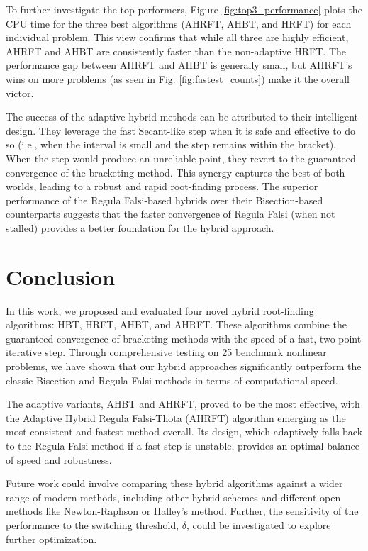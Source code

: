 \documentclass[reprint, amsmath, amssymb, aps, prl]{revtex4-2}
\begin{document}
\begin{table}[h!]
\begin{ruledtabular}
To further investigate the top performers, Figure \ref{fig:top3_performance} plots the CPU time for the three best algorithms (AHRFT, AHBT, and HRFT) for each individual problem. This view confirms that while all three are highly efficient, AHRFT and AHBT are consistently faster than the non-adaptive HRFT. The performance gap between AHRFT and AHBT is generally small, but AHRFT's wins on more problems (as seen in Fig. \ref{fig:fastest_counts}) make it the overall victor.

The success of the adaptive hybrid methods can be attributed to their intelligent design. They leverage the fast Secant-like step when it is safe and effective to do so (i.e., when the interval is small and the step remains within the bracket). When the step would produce an unreliable point, they revert to the guaranteed convergence of the bracketing method. This synergy captures the best of both worlds, leading to a robust and rapid root-finding process. The superior performance of the Regula Falsi-based hybrids over their Bisection-based counterparts suggests that the faster convergence of Regula Falsi (when not stalled) provides a better foundation for the hybrid approach.

\section{Conclusion}
In this work, we proposed and evaluated four novel hybrid root-finding algorithms: HBT, HRFT, AHBT, and AHRFT. These algorithms combine the guaranteed convergence of bracketing methods with the speed of a fast, two-point iterative step. Through comprehensive testing on 25 benchmark nonlinear problems, we have shown that our hybrid approaches significantly outperform the classic Bisection and Regula Falsi methods in terms of computational speed.

The adaptive variants, AHBT and AHRFT, proved to be the most effective, with the Adaptive Hybrid Regula Falsi-Thota (AHRFT) algorithm emerging as the most consistent and fastest method overall. Its design, which adaptively falls back to the Regula Falsi method if a fast step is unstable, provides an optimal balance of speed and robustness.

Future work could involve comparing these hybrid algorithms against a wider range of modern methods, including other hybrid schemes and different open methods like Newton-Raphson or Halley's method. Further, the sensitivity of the performance to the switching threshold, $\delta$, could be investigated to explore further optimization.


\end{ruledtabular}
\end{table}
\end{document}
